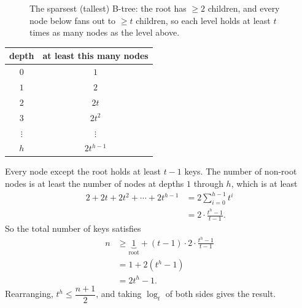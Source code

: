 \begin{figure}[H]
\begin{center}
\end{center}
\caption{The sparsest (tallest) B-tree: the root has $\ge 2$ children, and every
node below fans out to $\ge t$ children, so each level holds at least $t$ times as
many nodes as the level above.}
\label{ch18:fig-height-fanout}
\end{figure}

\begin{center}
\begin{tabular}{c c}
\toprule
depth & at least this many nodes \\
\midrule
$0$ & $1$ \\
$1$ & $2$ \\
$2$ & $2t$ \\
$3$ & $2t^2$ \\
$\vdots$ & $\vdots$ \\
$h$ & $2t^{h-1}$ \\
\bottomrule
\end{tabular}
\end{center}

Every node except the root holds at least $t-1$ keys. The number of non-root nodes
is at least the number of nodes at depths $1$ through $h$, which is at least
\begin{align*}
2 + 2t + 2t^2 + \cdots + 2t^{h-1} &= 2\sum_{i=0}^{h-1} t^i \\
  &= 2\cdot\frac{t^h - 1}{t-1}.
\end{align*}
So the total number of keys satisfies
\begin{align*}
n &\ge \underbrace{1}_{\text{root}} + (t-1)\cdot 2\cdot\frac{t^h-1}{t-1} \\
  &= 1 + 2(t^h - 1) \\
  &= 2t^h - 1.
\end{align*}
Rearranging, $t^h \le \dfrac{n+1}{2}$, and taking $\log_t$ of both sides gives the
result.

